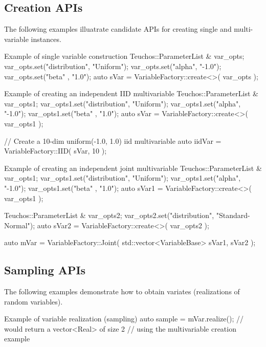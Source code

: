 \subsection{Creation APIs}

The following examples illuatrate candidate APIs for creating single
and multi-variable instances.

\begin{codelisting}{Example of single variable construction}
  Teuchos::ParameterList & var_opts;
  var_opts.set("distribution", "Uniform");
  var_opts.set("alpha", "-1.0");
  var_opts.set("beta" , "1.0");
  auto sVar = VariableFactory::create<>( var_opts );
\end{codelisting}


\begin{codelisting}{Example of creating an independent IID multivariable}
  Teuchos::ParameterList & var_opts1;
  var_opts1.set("distribution", "Uniform");
  var_opts1.set("alpha", "-1.0");
  var_opts1.set("beta" , "1.0");
  auto sVar = VariableFactory::create<>( var_opts1 );

  // Create a 10-dim uniform(-1.0, 1.0) iid multivariable
  auto iidVar = VariableFactory::IID( sVar, 10 );
\end{codelisting}


\begin{codelisting}{Example of creating an independent joint multivariable}
  Teuchos::ParameterList & var_opts1;
  var_opts1.set("distribution", "Uniform");
  var_opts1.set("alpha", "-1.0");
  var_opts1.set("beta" , "1.0");
  auto sVar1 = VariableFactory::create<>( var_opts1 );

  Teuchos::ParameterList & var_opts2;
  var_opts2.set("distribution", "Standard-Normal");
  auto sVar2 = VariableFactory::create<>( var_opts2 );

  auto mVar = VariableFactory::Joint( std::vector<VariableBase> {sVar1, sVar2} );
\end{codelisting}


\subsection{Sampling APIs}

The following examples demonstrate how to obtain variates (realizations
of random variables).

\begin{codelisting}{Example of variable realization (sampling)}
  auto sample = mVar.realize(); // would return a vector<Real> of size 2 
                                // using the multivariable creation  example
\end{codelisting}


